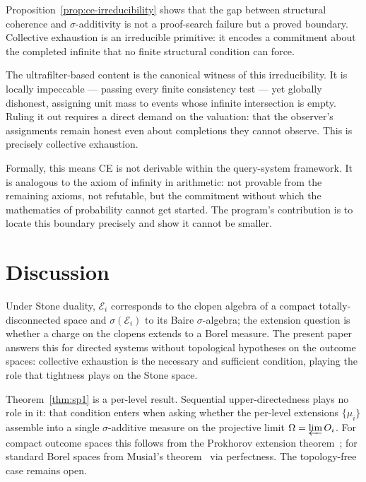 \begin{remark}
\label{rem:ce-irreducible}
Proposition~\ref{prop:ce-irreducibility} shows that the gap between structural coherence
and $\sigma$-additivity is not a proof-search failure but a proved boundary.  Collective
exhaustion is an irreducible primitive: it encodes a commitment about the completed
infinite that no finite structural condition can force.

The ultrafilter-based content is the canonical witness of this irreducibility.  It is
locally impeccable — passing every finite consistency test — yet globally dishonest,
assigning unit mass to events whose infinite intersection is empty.  Ruling it out
requires a direct demand on the valuation: that the observer's assignments remain
honest even about completions they cannot observe.  This is precisely collective
exhaustion.

Formally, this means CE is not derivable within the query-system framework.  It is
analogous to the axiom of infinity in arithmetic: not provable from the remaining
axioms, not refutable, but the commitment without which the mathematics of
probability cannot get started.  The program's contribution is to locate this
boundary precisely and show it cannot be smaller.
\end{remark}

\section{Discussion}
\label{sec:discussion}

Under Stone duality, $\mathcal{E}_i$ corresponds to the clopen algebra of a compact
totally-disconnected space and $\sigma(\mathcal{E}_i)$ to its Baire $\sigma$-algebra;
the extension question is whether a charge on the clopens extends to a Borel measure.
The present paper answers this for directed systems without topological hypotheses
on the outcome spaces: collective exhaustion is the necessary and sufficient
condition, playing the role that tightness plays on the Stone space.

Theorem~\ref{thm:sp1} is a per-level result.  Sequential upper-directedness plays
no role in it: that condition enters when asking whether the per-level extensions
$\{\mu_i\}$ assemble into a single $\sigma$-additive measure on the projective
limit $\Omega = \varprojlim O_i$.  For compact outcome spaces this follows from
the Prokhorov extension theorem~\cite{Prokhorov1956}; for standard Borel spaces from
Musia\l's theorem~\cite{Musial1980} via perfectness.  The topology-free case remains open.

